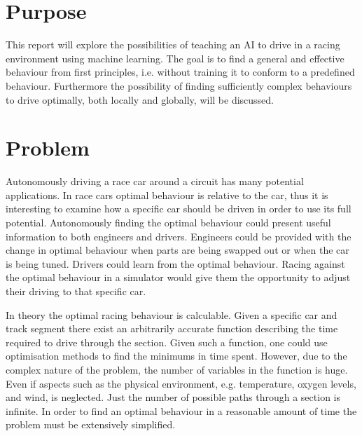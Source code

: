 \section{Purpose}
This report will explore the possibilities of teaching an AI to drive in a racing environment using machine learning. The goal is to find a general and effective behaviour from first principles, i.e. without training it to conform to a predefined behaviour. Furthermore the possibility of finding sufficiently complex behaviours to drive optimally, both locally and globally, will be discussed. 

\section{Problem}

    

Autonomously driving a race car around a circuit has many potential applications. In race cars optimal behaviour is relative to the car, thus it is interesting to examine how a specific car should be driven in order to use its full potential. Autonomously finding the optimal behaviour could present useful information to both engineers and drivers. Engineers could be provided with the change in optimal behaviour when parts are being swapped out or when the car is being tuned. Drivers could learn from the optimal behaviour. Racing against the optimal behaviour in a simulator would give them the opportunity to adjust their driving to that specific car.

In theory the optimal racing behaviour is calculable. Given a specific car and track segment there exist an arbitrarily accurate function describing the time required to drive through the section. Given such a function, one could use optimisation methods to find the minimums in time spent. However, due to the complex nature of the problem, the number of variables in the function is huge. Even if aspects such as the physical environment, e.g. temperature, oxygen levels, and wind, is neglected. Just the number of possible paths through a section is infinite. In order to find an optimal behaviour in a reasonable amount of time the problem must be extensively simplified.

